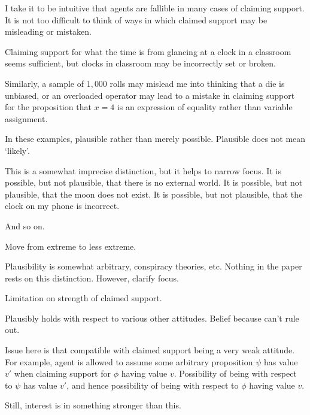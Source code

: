 \begin{note}
  \color{red}
  I take it to be intuitive that agents are fallible in many cases of claiming support.
  It is not too difficult to think of ways in which claimed support may be misleading or mistaken.

  Claiming support for what the time is from glancing at a clock in a classroom seems sufficient, but clocks in classroom may be incorrectly set or broken.

  Similarly, a sample of \(1,000\) rolls may mislead me into thinking that a die is unbiased, or an overloaded operator may lead to a mistake in claiming support for the proposition that \(x = 4\) is an expression of equality rather than variable assignment.
\end{note}

\begin{note}
  In these examples, plausible rather than merely possible.
  Plausible does not mean `likely'.

  This is a somewhat imprecise distinction, but it helps to narrow focus.
  It is possible, but not plausible, that there is no external world.
  It is possible, but not plausible, that the moon does not exist.
  It is possible, but not plausible, that the clock on my phone is incorrect.

  And so on.

  Move from extreme to less extreme.

  Plausibility is somewhat arbitrary, conspiracy theories, etc.
  Nothing in the paper rests on this distinction.
  However, clarify focus.
\end{note}

\begin{note}
  Limitation on strength of claimed support.

  Plausibly holds with respect to various other attitudes.
  Belief because can't rule out.

  Issue here is that compatible with claimed support being a very weak attitude.
  For example, agent is allowed to assume some arbitrary proposition \(\psi\) has value \(v'\) when claiming support for \(\phi\) having value \(v\).
  Possibility of being \mistaken{} with respect to \(\psi\) has value \(v'\), and hence possibility of being \misled{} with respect to \(\phi\) having value \(v\).

  Still, interest is in something stronger than this.
\end{note}


